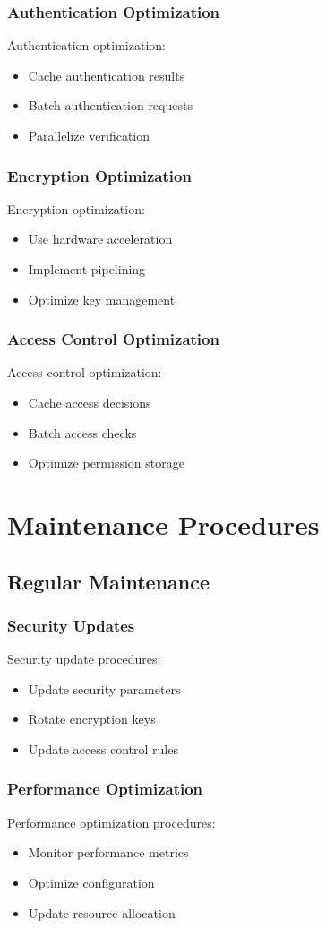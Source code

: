 \documentclass[12pt]{article}
\begin{document}
\subsubsection{Authentication Optimization}
Authentication optimization:
\begin{itemize}
\item Cache authentication results
\item Batch authentication requests
\item Parallelize verification
\end{itemize}
\subsubsection{Encryption Optimization}
Encryption optimization:
\begin{itemize}
\item Use hardware acceleration
\item Implement pipelining
\item Optimize key management
\end{itemize}
\subsubsection{Access Control Optimization}
Access control optimization:
\begin{itemize}
\item Cache access decisions
\item Batch access checks
\item Optimize permission storage
\end{itemize}
\section{Maintenance Procedures}
\subsection{Regular Maintenance}
\subsubsection{Security Updates}
Security update procedures:
\begin{itemize}
\item Update security parameters
\item Rotate encryption keys
\item Update access control rules
\end{itemize}
\subsubsection{Performance Optimization}
Performance optimization procedures:
\begin{itemize}
\item Monitor performance metrics
\item Optimize configuration
\item Update resource allocation
\end{itemize}
\end{document}
